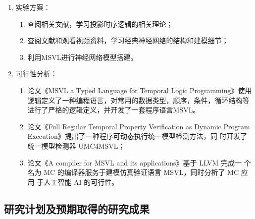 \begin{enumerate}[(1)]
\begin{lstlisting} [language=c]
	int NeuronNum;             // number of neuron [int]
	int AcitFuncNum;           // active function [int]
}FCLayer;
\end{lstlisting}
  \item 实验方案：
  \begin{enumerate}
    \item 查阅相关文献，学习投影时序逻辑的相关理论；
    \item 查阅文献和观看视频资料，学习经典神经网络的结构和建模细节；
    \item 利用MSVL进行神经网络模型搭建。
  \end{enumerate}
  \item 可行性分析：
  \begin{enumerate}
    \item 论文《MSVL a Typed Language for Temporal Logic Programming》使用逻辑定义了一种编程语言，对常用的数据类型，顺序，条件，循环结构等进行了严格的逻辑定义，并开发了一套程序语言MSVL。
    \item 论文《Full Regular Temporal Property Verification as Dynamic Pro\-gram Execution》提出了一种程序可动态执行统一模型检测方法，同 时开发了统一模型检测器 UMC4MSVL；
    \item 论文《A compiler for MSVL and its applications》基于 LLVM 完成一
个名为 MC 的编译器服务于建模仿真验证语言 MSVL，同时分析了 MC 应用
于人工智能 AI 的可行性。
  \end{enumerate}
\end{enumerate}


\subsection{研究计划及预期取得的研究成果}
\begin{table}[!h]
\end{table}


